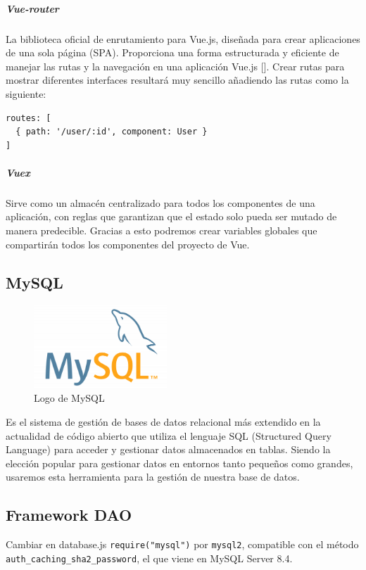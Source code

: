 \subparagraph{Vue-router}
La biblioteca oficial de enrutamiento para Vue.js, diseñada para crear aplicaciones de una sola página (SPA). Proporciona una forma estructurada y eficiente de manejar las rutas y la navegación en una aplicación Vue.js [\cite{vue_route}]. Crear rutas para mostrar diferentes interfaces resultará muy sencillo añadiendo las rutas como la siguiente:

\begin{lstlisting}[style=PHP-color, caption={Código para agregar un icono a la página},label=PHP-color_code]
routes: [
  { path: '/user/:id', component: User }
]
\end{lstlisting}

\subparagraph{Vuex}
Sirve como un almacén centralizado para todos los componentes de una aplicación, con reglas que garantizan que el estado solo pueda ser mutado de manera predecible. Gracias a esto podremos crear variables globales que compartirán todos los componentes del proyecto de Vue.

\subsection{MySQL}

\begin{figure}[H]
    \centering
    \includegraphics[width=5cm]{archivos/tfg_jorge/logos/mysql}
    \caption{Logo de MySQL}\label{sistemass2}
\end{figure}

Es el sistema de gestión de bases de datos relacional más extendido en la actualidad de código abierto que utiliza el lenguaje SQL (Structured Query Language) para acceder y gestionar datos almacenados en tablas. Siendo la elección popular para gestionar datos en entornos tanto pequeños como grandes, usaremos esta herramienta para la gestión de nuestra base de datos.

\subsection{Framework DAO}
Cambiar en database.js \lstinline|require("mysql")| por \lstinline|mysql2|, compatible con el método \lstinline|auth_caching_sha2_password|, el que viene en MySQL Server 8.4.

